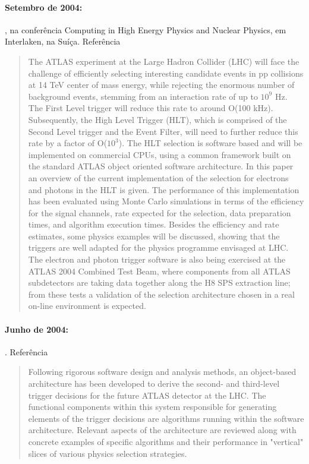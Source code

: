 \paragraph{Setembro de 2004: }, na conferência Computing in High Energy Physics and Nuclear
Physics, em Interlaken, na Suíça. Referência~\cite{aa:chep-04-01}

\begin{quotation}
The ATLAS experiment at the Large Hadron Collider (LHC) will face the
challenge of efficiently selecting interesting candidate events in pp
collisions at 14 TeV center of mass energy, while rejecting the enormous
number of background events, stemming from an interaction rate of up to $10^9$
Hz. The First Level trigger will reduce this rate to around O(100
kHz). Subsequently, the High Level Trigger (HLT), which is comprised of the
Second Level trigger and the Event Filter, will need to further reduce this
rate by a factor of O($10^3$). The HLT selection is software based and will be
implemented on commercial CPUs, using a common framework built on the standard
ATLAS object oriented software architecture. In this paper an overview of the
current implementation of the selection for electrons and photons in the HLT
is given. The performance of this implementation has been evaluated using
Monte Carlo simulations in terms of the efficiency for the signal channels,
rate expected for the selection, data preparation times, and algorithm
execution times. Besides the efficiency and rate estimates, some physics
examples will be discussed, showing that the triggers are well adapted for the
physics programme envisaged at LHC. The electron and photon trigger software
is also being exercised at the ATLAS 2004 Combined Test Beam, where components
from all ATLAS subdetectors are taking data together along the H8 SPS
extraction line; from these tests a validation of the selection architecture
chosen in a real on-line environment is expected.
\end{quotation}

\paragraph{Junho de 2004: }. Referência~\cite{aa:tns-04-05}

\begin{quotation}
Following rigorous software design and analysis methods, an object-based
architecture has been developed to derive the second- and third-level trigger
decisions for the future ATLAS detector at the LHC. The functional components
within this system responsible for generating elements of the trigger
decisions are algorithms running within the software architecture. Relevant
aspects of the architecture are reviewed along with concrete examples of
specific algorithms and their performance in "vertical" slices of various
physics selection strategies.
\end{quotation}

